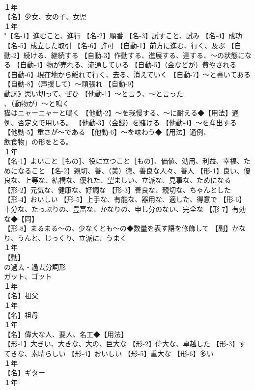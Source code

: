 \documentclass[8pt]{extreport}
\begin{document}
\begin{CJK}{UTF8}{min}
\\	１年	
\\	【名】少女、女の子、女児
\\	１年	
\\	"【名-1】進むこと、進行 【名-2】順番 【名-3】試すこと、試み 【名-4】成功 【名-5】成立した取引 【名-6】許可 【自動-1】前方に進む、行く、及ぶ 【自動-2】続ける、継続する 【自動-3】作動する、進展する、達する、～の状態になる 【自動-4】物が売れる、流通している 【自動-5】（金などが）費やされる 【自動-6】現在地から離れて行く、去る、消えていく 【自動-7】～と書いてある 【自動-8】（声援して）～頑張れ 【自動-9】
\\	動詞》思い切って、ぜひ 【他動-1】～と言う、～と言った
\\	、（動物が）～と鳴く 
\\	猫はニャーニャーと鳴く 【他動-2】～を我慢する、～に耐える◆【用法】通例、否定文で用いる。 【他動-3】（金銭）を賭ける 【他動-4】～を産出する 【他動-5】重さが～である 【他動-6】～を味わう◆【用法】通例、
\\	飲食物」の形をとる。
\\	１年	
\\	【名-1】よいこと［もの］、役に立つこと［もの］、価値、効用、利益、幸福、ためになること 【名-2】親切、善、（美）徳、善良な人々、善人 【形-1】良い、優良な、上等な、結構な、優れた、望ましい、立派な、見事な、ためになる 【形-2】元気な、健康な、好調な 【形-3】善良な、親切な、ちゃんとした 【形-4】おいしい 【形-5】上手な、有能な、器用な、適した、得意で 【形-6】十分な、たっぷりの、豊富な、かなりの、申し分のない、完全な 【形-7】有効な◆【同】
\\	【形-8】まるまる～の、少なくとも～の◆数量を表す語を修飾して 【副】かなり、うんと、じっくり、立派に、うまく
\\	１年	
\\	【動】
\\	の過去・過去分詞形 
\\	ガット、ゴット
\\	１年	
\\	【名】祖父
\\	１年	
\\	【名】祖母
\\	１年	
\\	【名】偉大な人、要人、名工◆【用法】
\\	【形-1】大きい、大きな、大の、巨大な 【形-2】偉大な、卓越した 【形-3】すてきな、素晴らしい 【形-4】おいしい 【形-5】重大な 【形-6】多い
\\	１年	
\\	【名】ギター
\\	１年	

\end{CJK}
\end{document}
